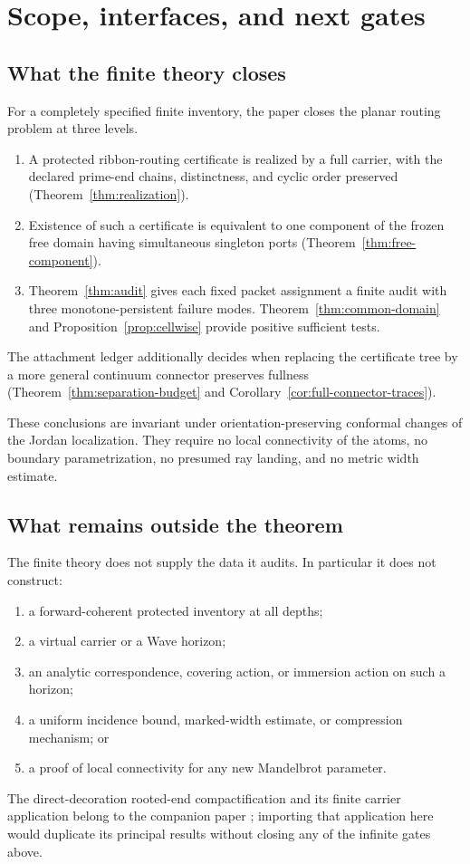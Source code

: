 \section{Scope, interfaces, and next gates}
\label{sec:scope}

\subsection{What the finite theory closes}

For a completely specified finite inventory, the paper closes the planar
routing problem at three levels.
\begin{enumerate}
\item A protected ribbon-routing certificate is realized by a full carrier,
with the declared prime-end chains, distinctness, and cyclic order preserved
(Theorem~\ref{thm:realization}).
\item Existence of such a certificate is equivalent to one component of the
frozen free domain having simultaneous singleton ports
(Theorem~\ref{thm:free-component}).
\item Theorem~\ref{thm:audit} gives each fixed packet assignment a finite
audit with three monotone-persistent failure modes.
Theorem~\ref{thm:common-domain} and Proposition~\ref{prop:cellwise}
provide positive sufficient tests.
\end{enumerate}
The attachment ledger additionally decides when replacing the certificate
tree by a more general continuum connector preserves fullness
(Theorem~\ref{thm:separation-budget} and
Corollary~\ref{cor:full-connector-traces}).

These conclusions are invariant under orientation-preserving conformal
changes of the Jordan localization.  They require no local connectivity of
the atoms, no boundary parametrization, no presumed ray landing, and no
metric width estimate.

\subsection{What remains outside the theorem}

The finite theory does not supply the data it audits.  In particular it does
not construct:
\begin{enumerate}
\item a forward-coherent protected inventory at all depths;
\item a virtual carrier or a Wave horizon;
\item an analytic correspondence, covering action, or immersion action on
such a horizon;
\item a uniform incidence bound, marked-width estimate, or compression
mechanism; or
\item a proof of local connectivity for any new Mandelbrot parameter.
\end{enumerate}
The direct-decoration rooted-end compactification and its finite carrier
application belong to the companion paper \cite{Wes26}; importing that
application here would duplicate its principal results without closing any
of the infinite gates above.


